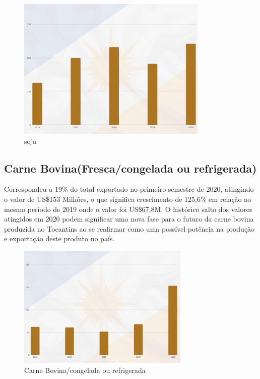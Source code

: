 \begin{figure} [h] \caption{soja}
	\includegraphics[width=\linewidth]{fig/soja1.png}
\end{figure}

\newpage
\subsection{Carne Bovina(Fresca/congelada ou refrigerada)}
Correspondeu a 19\% do total exportado no primeiro semestre de 2020, atingindo o valor de US\$153 Milhões, o que significa crescimento de 125,6\% em relação ao mesmo período de 2019 onde o valor foi US\$67,8M. O histórico salto dos valores atingidos em 2020 podem significar uma nova fase para o futuro da carne bovina produzida no Tocantins ao se reafirmar como uma possível potência na produção e exportação deste produto no país.

\begin{figure} [h] \caption{Carne Bovina/congelada ou refrigerada}
	\includegraphics[width=\linewidth]{fig/carne1.png}
\end{figure}
\newpage 

